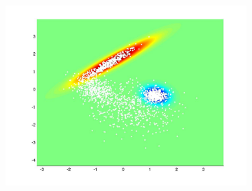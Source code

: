 \documentclass[useAMS,usenatbib,fleqn]{mn2e}
\begin{document}
\begin{figure}
\begin{subfigure}[b]{90 px}
                \includegraphics[trim = 150px 100px 150px 70px, clip=true,width=\textwidth]{VC2.jpg}
        \end{subfigure}
       

\end{figure}
\end{document}
